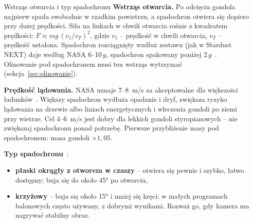 \begin{podsekcja}{Wstrząs otwarcia i typ spadochronu}\label{sec:wstrzas}
\textbf{Wstrząs otwarcia.} Po odcięciu gondola najpierw spada swobodnie w rzadkim powietrzu, a spadochron otwiera się dopiero przy dużej prędkości. Siła na linkach w chwili otwarcia rośnie z kwadratem prędkości: $F \approx m g\,(v_1/v_T)^2$, gdzie $v_1$ -- prędkość w chwili otwarcia, $v_T$ -- prędkość ustalona. Spadochron rozciągnięty wzdłuż zestawu (jak w Stardust NEXT) daje według NASA 6--10\,$g$, spadochron spakowany poniżej 2\,$g$~\cite[rozdz.~14]{nasahb}. Olinowanie pod spadochronem musi ten wstrząs wytrzymać (sekcja~\ref{sec:olinowanie}).


\textbf{Prędkość lądowania.} NASA uznaje 7--8~m/s za akceptowalne dla większości ładunków~\cite[rozdz.~14]{nasahb}. Większy spadochron wydłuża opadanie i dryf, zwiększa ryzyko lądowania na drzewie albo liniach energetycznych i wleczenia gondoli po ziemi przy wietrze. Cel 4--6~m/s jest dobry dla lekkich gondoli styropianowych -- nie zwiększaj spadochronu ponad potrzebę. Pierwsze przybliżenie masy pod spadochronem: masa gondoli $\times 1{,}05$.

\textbf{Typ spadochronu}~\cite[rozdz.~14]{nasahb}:
\begin{itemize}
  \item \textbf{płaski okrągły z otworem w czaszy} -- otwiera się pewnie i szybko, łatwo dostępny; buja się do około 45° po otwarciu,
  \item \textbf{krzyżowy} -- buja się około 15° i mniej się kręci; w małych programach balonowych często używany, z dobrymi wynikami. Rozważ go, gdy kamera ma nagrywać stabilny obraz.
\end{itemize}
\end{podsekcja}

